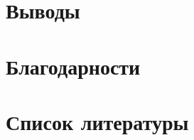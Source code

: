 \documentclass[a4paper,12pt]{article} %
\begin{document}
\cite{makhrova2017work}

\section{Выводы}
\section{Благодарности}
\section{Список литературы}


\printbibliography
\end{document}
